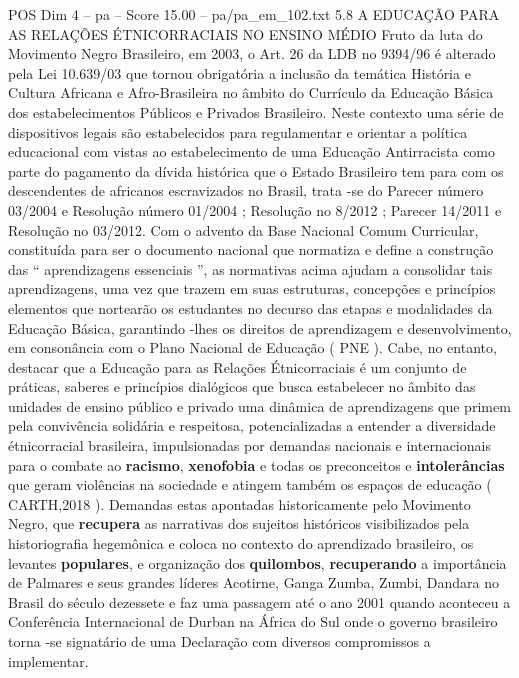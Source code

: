 \begin{textsample}{POS Dim 4 – pa – Score 15.00 – pa/pa\_em\_102.txt}  \label{ex:f4_pos_009}
5.8 A EDUCAÇÃO PARA AS RELAÇÕES ÉTNICORRACIAIS NO ENSINO MÉDIO Fruto da luta do Movimento Negro Brasileiro, em 2003, o Art. 26 da LDB no 9394/96 é alterado pela Lei 10.639/03 que tornou obrigatória a inclusão da temática História e Cultura Africana e Afro-Brasileira no âmbito do Currículo da Educação Básica dos estabelecimentos Públicos e Privados Brasileiro.
Neste contexto uma série de dispositivos legais são estabelecidos para regulamentar e orientar a política educacional com vistas ao estabelecimento de uma Educação Antirracista como parte do pagamento da dívida histórica que o Estado Brasileiro tem para com os descendentes de africanos escravizados no Brasil, trata -se do Parecer número 03/2004 e Resolução número 01/2004 ; Resolução no 8/2012 ; Parecer 14/2011 e Resolução no 03/2012.
Com o advento da Base Nacional Comum Curricular, constituída para ser o documento nacional que normatiza e define a construção das “ aprendizagens essenciais ”, as normativas acima ajudam a consolidar tais aprendizagens, uma vez que trazem em suas estruturas, concepções e princípios elementos que nortearão os estudantes no decurso das etapas e modalidades da Educação Básica, garantindo -lhes os direitos de aprendizagem e desenvolvimento, em consonância com o Plano Nacional de Educação ( PNE ).
Cabe, no entanto, destacar que a Educação para as Relações Étnicorraciais é um conjunto de práticas, saberes e princípios dialógicos que busca estabelecer no âmbito das unidades de ensino público e privado uma dinâmica de aprendizagens que primem pela convivência solidária e respeitosa, potencializadas a entender a diversidade étnicorracial brasileira, impulsionadas por demandas nacionais e internacionais para o combate ao \textbf{racismo}, \textbf{xenofobia} e todas os preconceitos e \textbf{intolerâncias} que geram violências na sociedade e atingem também os espaços de educação ( CARTH,2018 ).
Demandas estas apontadas historicamente pelo Movimento Negro, que \textbf{recupera} as narrativas dos sujeitos históricos visibilizados pela historiografia hegemônica e coloca no contexto do aprendizado brasileiro, os levantes \textbf{populares}, e organização dos \textbf{quilombos}, \textbf{recuperando} a importância de Palmares e seus grandes líderes Acotirne, Ganga Zumba, Zumbi, Dandara no Brasil do século dezessete e faz uma passagem até o ano 2001 quando aconteceu a Conferência Internacional de Durban na África do Sul onde o governo brasileiro torna -se signatário de uma Declaração com diversos compromissos a implementar.

\end{textsample}
